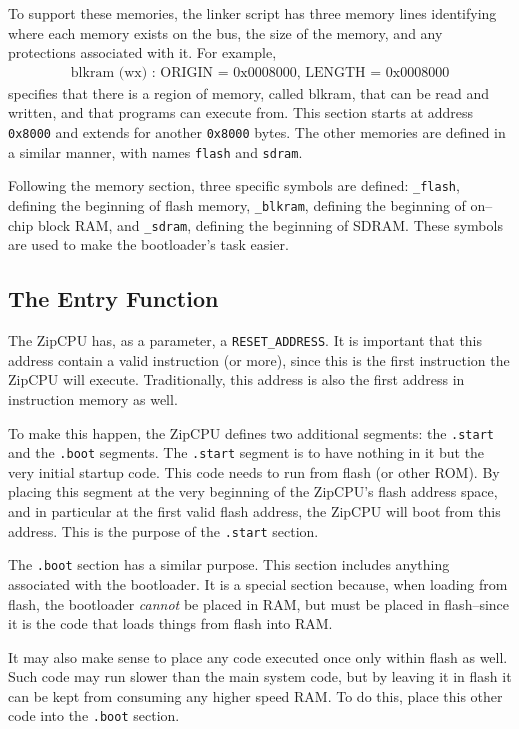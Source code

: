 \documentclass{gqtekspec}
\begin{document}
To support these memories, the linker script has three memory lines identifying
where each memory exists on the bus, the size of the memory, and any protections
associated with it.  For example,
\begin{eqnarray*}
\mbox{blkram (wx) : ORIGIN = 0x0008000, LENGTH = 0x0008000}
\end{eqnarray*}
specifies that there is a region of memory, called blkram, that can be read and
written, and that programs can execute from.  This section starts at address
{\tt 0x8000} and extends for another {\tt 0x8000} bytes.  The other memories
are defined in a similar manner, with names {\tt flash} and {\tt sdram}.

Following the memory section, three specific symbols are defined:
	{\tt \_flash}, defining the beginning of flash memory,
	{\tt \_blkram}, defining the beginning of on--chip block RAM,
	and
	{\tt \_sdram}, defining the beginning of SDRAM.
These symbols are used to make the bootloader's task easier.

\subsection{The Entry Function}\label{sec:ld-entry}
The ZipCPU has, as a parameter, a {\tt RESET\_ADDRESS}.  It is important
that this address contain a valid instruction (or more), since this is the
first instruction the ZipCPU will execute.  Traditionally, this address is also
the first address in instruction memory as well.

To make this happen, the ZipCPU defines two additional segments: the
{\tt .start} and the {\tt .boot} segments.  The {\tt  .start} segment is to 
have nothing in it but the very initial startup code.  This code needs to run 
from flash (or other ROM).  By placing this segment at the very beginning of
the ZipCPU's flash address space, and in particular at the first valid flash
address, the ZipCPU will boot from this address.  This is the purpose of the
{\tt .start} section.

The {\tt .boot} section has a similar purpose.  This section includes anything
associated with the bootloader.  It is a special section because, when loading
from flash, the bootloader {\em cannot} be placed in RAM, but must be placed
in flash--since it is the code that loads things from flash into RAM.

It may also make sense to place any code executed once only within flash as
well.  Such code may run slower than the main system code, but by leaving it in
flash it can be kept from consuming any higher speed RAM.  To do this, place
this other code into the {\tt .boot} section.
\end{document}
